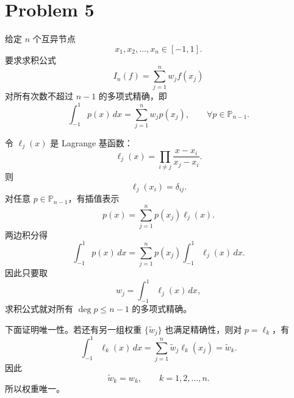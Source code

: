 \documentclass{ctexart}
\begin{document}
\section*{Problem 5}
\begin{solution}


  给定 $n$ 个互异节点
  \[
    x_1,x_2,\ldots,x_n\in[-1,1].
  \]
  要求求积公式
  \[
    I_n(f)=\sum_{j=1}^n w_j f(x_j)
  \]
  对所有次数不超过 $n-1$ 的多项式精确，即
  \[
    \int_{-1}^1 p(x)\,dx=\sum_{j=1}^n w_jp(x_j),
    \qquad \forall p\in\mathbb{P}_{n-1}.
  \]

  令 $\ell_j(x)$ 是 Lagrange 基函数：
  \[
    \ell_j(x)=\prod_{i\ne j}\frac{x-x_i}{x_j-x_i}.
  \]
  则
  \[
    \ell_j(x_i)=\delta_{ij}.
  \]
  对任意 $p\in\mathbb{P}_{n-1}$，有插值表示
  \[
    p(x)=\sum_{j=1}^n p(x_j)\ell_j(x).
  \]
  两边积分得
  \[
    \int_{-1}^1 p(x)\,dx
    =
    \sum_{j=1}^n p(x_j)\int_{-1}^1\ell_j(x)\,dx.
  \]
  因此只要取
  \[
    w_j=\int_{-1}^1\ell_j(x)\,dx,
  \]
  求积公式就对所有 $\deg p\le n-1$ 的多项式精确。

  下面证明唯一性。若还有另一组权重 $\{\tilde w_j\}$ 也满足精确性，则对 $p=\ell_k$，有
  \[
    \int_{-1}^1\ell_k(x)\,dx
    =
    \sum_{j=1}^n \tilde w_j\ell_k(x_j)
    =
    \tilde w_k.
  \]
  因此
  \[
    \tilde w_k=w_k,
    \qquad k=1,2,\ldots,n.
  \]
  所以权重唯一。

\end{solution}
\end{document}
